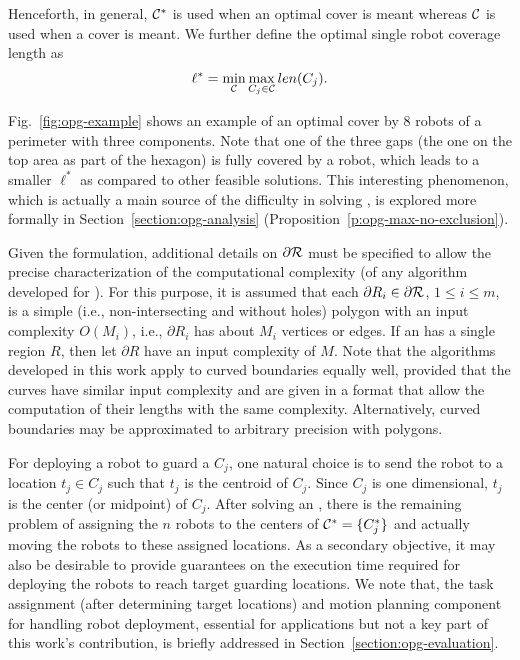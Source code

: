 Henceforth, in general, $\mathcal C^*$ is used when an optimal cover is meant 
whereas $\mathcal C$ is used when a cover is meant. We further define the optimal 
single robot coverage length as 
\begin{align}\label{eq:opg-l-star}
\vspace*{-1mm}
\ell^* = \min_{\C} \max_{C_j \in \C} len(C_j).
\vspace*{-1mm}
\end{align}

Fig.~\ref{fig:opg-example} shows an example of an optimal cover by $8$ robots 
of a perimeter with three components. Note that one of the three gaps 
(the one on the top area as part of the hexagon) is fully covered 
by a robot, which leads to a smaller $\ell^*$ as compared to other 
feasible solutions. This interesting phenomenon, which is 
actually a main source of the difficulty in solving \opg, is explored 
more formally in Section~\ref{section:opg-analysis} 
(Proposition~\ref{p:opg-max-no-exclusion}).

Given the \opg formulation, additional details on $\partial \mathcal R$ must 
be specified to allow the precise characterization of the computational 
complexity (of any algorithm developed for \opg). For this purpose, it 
is assumed that each $\partial R_i \in \partial \mathcal R$, $1 \le i \le m$, 
is a simple (i.e., non-intersecting and without holes) polygon with an 
input complexity $O(M_i)$, i.e., $\partial R_i$ has about $M_i$ vertices 
or edges. If an \opg has a single region $R$, then let $\partial R$ have 
an input complexity of $M$. Note that the algorithms developed in this 
work apply to curved boundaries equally well, provided that the curves 
have similar input complexity and are given in a format that allow the 
computation of their lengths with the same complexity. 
Alternatively, curved boundaries may be approximated to arbitrary 
precision with polygons. 


For deploying a robot to guard a $C_j$, one natural choice is to send the 
robot to a location $t_j \in C_j$ such that $t_j$ is the centroid of $C_j$. 
Since $C_j$ is one dimensional, $t_j$ is the center (or midpoint) of $C_j$. 
After solving an \opg, there is the remaining problem of assigning the $n$ 
robots to the centers of $\mathcal C^* = \{C_j^*\}$ and actually moving the robots 
to these assigned locations. As a secondary objective, it may also be 
desirable to provide guarantees on the execution time required for 
deploying the robots to reach target guarding locations. We note that, 
the task assignment (after determining target locations) and motion 
planning component for handling robot deployment, essential for applications 
but not a key part of this work's contribution, is briefly addressed in 
Section~\ref{section:opg-evaluation}. 

